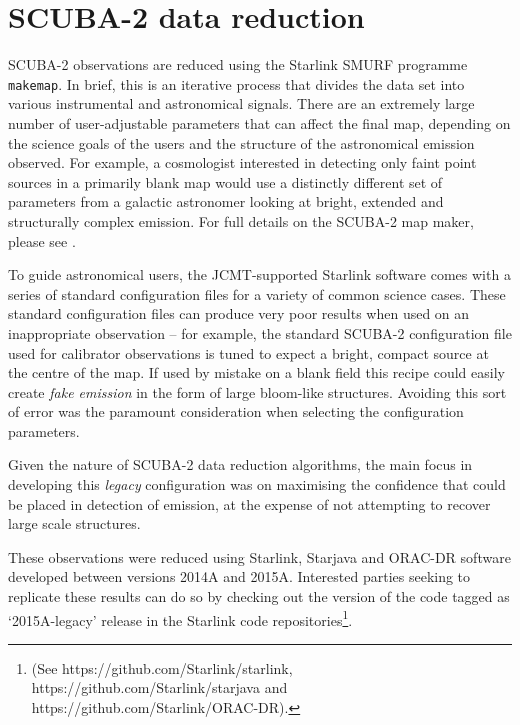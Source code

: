 \documentclass[usenatbib]{mnras}
\begin{document}
\section{SCUBA-2 data reduction}
SCUBA-2 observations are reduced using the Starlink SMURF programme
\texttt{makemap}. In brief, this is an iterative process that divides
the data set into various instrumental and astronomical signals. There
are an extremely large number of user-adjustable parameters that can
affect the final map, depending on the science goals of the users and
the structure of the astronomical emission observed. For example, a
cosmologist interested in detecting only faint point sources in a
primarily blank map would use a distinctly different set of parameters
from a galactic astronomer looking at bright, extended and
structurally complex emission. For full details on the SCUBA-2 map
maker, please see \citet{Chapin2013}.

To guide astronomical users, the JCMT-supported Starlink software
comes with a series of standard configuration files for a variety of
common science cases.
These standard configuration files can produce very poor results when used on an
inappropriate observation -- for example, the standard SCUBA-2 configuration file
used for calibrator observations is tuned to expect a bright, compact
source at the centre of the map. If used by mistake on a blank field
this recipe could easily create \emph{fake emission} in the form of
large bloom-like structures. Avoiding this sort of error was the
paramount consideration when selecting the configuration parameters.

Given the nature of SCUBA-2 data reduction algorithms, the main focus
in developing this \emph{legacy} configuration was on maximising the
confidence that could be placed in detection of emission, at the
expense of not attempting to recover large scale structures.

These observations were reduced using Starlink, Starjava and ORAC-DR
software developed between versions 2014A and 2015A. Interested
parties seeking to replicate these results can do so by checking out the
version of the code tagged as `2015A-legacy' release in the Starlink code repositories\footnote{(See
  https://github.com/Starlink/starlink,
  https://github.com/Starlink/starjava and
  https://github.com/Starlink/ORAC-DR).}.
\end{document}
